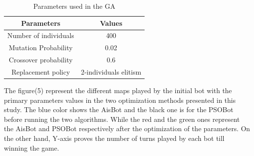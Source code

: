 \documentclass[]{interact}
\theoremstyle{plain}%
\theoremstyle{definition}
\theoremstyle{remark}
\begin{document}
\begin{table}[h!]
\centering
\begin{tabular}{ |c|c| }
\hline
 Parameters & Values \\ 
\hline
 Number of individuals & 400 \\ 
 Mutation Probability & 0.02 \\  
 Crossover probability & 0.6 \\
 Replacement policy & 2-individuals elitism \\
 \hline   
\end{tabular}
\caption{Parameters used in the GA}
\label{TABLE 3}
\end{table}



The figure(5) represent the different maps played by the initial bot with the primary parameters values in the two optimization methods presented in this study. The blue color shows the AisBot and the black one is for the PSOBot before running the two algorithms. While the red and the green ones represent the AisBot and PSOBot respectively after the optimization of the parameters. On the other hand, Y-axis proves the number of turns played by each bot till winning the game. \\

\end{document}

